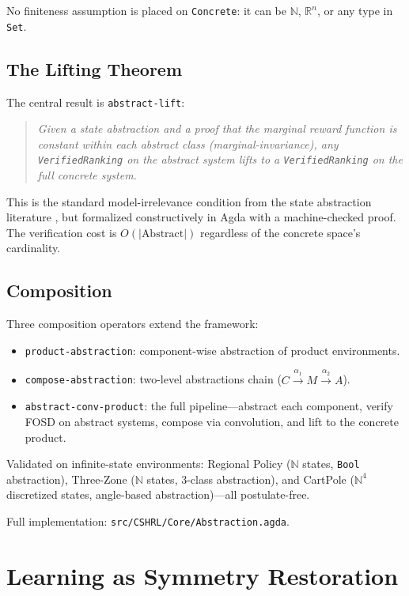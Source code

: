 \documentclass[9pt,a4paper]{article}
\newcommand{\fpath}[1]{\nolinkurl{#1}}
\theoremstyle{plain}
\theoremstyle{definition}
\theoremstyle{remark}
\begin{document}
\noindent No finiteness assumption is placed on \texttt{Concrete}: it can be $\mathbb{N}$, $\mathbb{R}^n$, or any type in \texttt{Set}.

\subsection{The Lifting Theorem}

The central result is \texttt{abstract-lift}:

\begin{quote}
\emph{Given a state abstraction and a proof that the marginal reward function is constant within each abstract class (marginal-invariance), any \texttt{VerifiedRanking} on the abstract system lifts to a \texttt{VerifiedRanking} on the full concrete system.}
\end{quote}

\noindent This is the standard model-irrelevance condition from the state abstraction literature \cite{Li2006}, but formalized constructively in Agda with a machine-checked proof.  The verification cost is $O(|\text{Abstract}|)$ regardless of the concrete space's cardinality.

\subsection{Composition}

Three composition operators extend the framework:
\begin{itemize}
\item \texttt{product-abstraction}: component-wise abstraction of product environments.
\item \texttt{compose-abstraction}: two-level abstractions chain ($C \xrightarrow{\alpha_1} M \xrightarrow{\alpha_2} A$).
\item \texttt{abstract-conv-product}: the full pipeline---abstract each component, verify FOSD on abstract systems, compose via convolution, and lift to the concrete product.
\end{itemize}

\noindent Validated on infinite-state environments: Regional Policy ($\mathbb{N}$ states, \texttt{Bool} abstraction), Three-Zone ($\mathbb{N}$ states, 3-class abstraction), and CartPole ($\mathbb{N}^4$ discretized states, angle-based abstraction)---all postulate-free.

Full implementation: \fpath{src/CSHRL/Core/Abstraction.agda}.

\section{Learning as Symmetry Restoration}\label{sec:learning}
\end{document}
